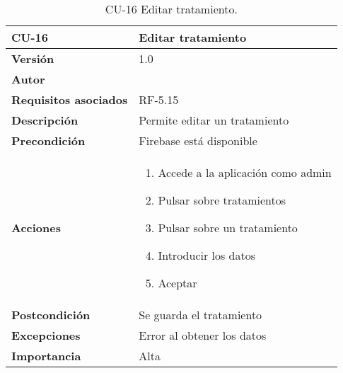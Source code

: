 \begin{table}[p]
	\centering
	\begin{tabularx}{\linewidth}{ p{} p{} }
		\toprule
		\textbf{CU-16}    & \textbf{Editar tratamiento}\\
		\toprule
		\textbf{Versión}              & 1.0    \\
		\textbf{Autor}                & {\nombre} \\
		\textbf{Requisitos asociados} & RF-5.15 \\
		\textbf{Descripción}          & Permite editar un tratamiento \\
		\textbf{Precondición}         & Firebase está disponible \\
		\textbf{Acciones}             &
		\begin{enumerate}
			\def\labelenumi{\arabic{enumi}.}
			\tightlist
			\item Accede a la aplicación como admin
			\item Pulsar sobre tratamientos
			\item Pulsar sobre un tratamiento
			\item Introducir los datos
			\item Aceptar
		\end{enumerate}\\
		\textbf{Postcondición}        & Se guarda el tratamiento\\
		\textbf{Excepciones}          & Error al obtener los datos \\
		\textbf{Importancia}          & Alta \\
		\bottomrule
	\end{tabularx}
	\caption{CU-16 Editar tratamiento.}
\end{table}


